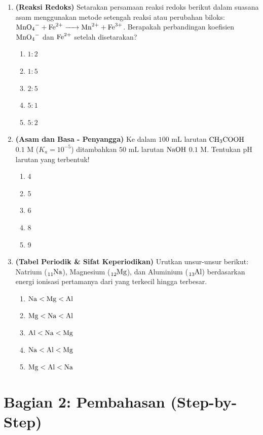 \documentclass[12pt,a4paper]{article}
\begin{document}
\begin{enumerate}
    \item \textbf{(Reaksi Redoks)} Setarakan persamaan reaksi redoks berikut dalam suasana asam menggunakan metode setengah reaksi atau perubahan biloks: $\ce{MnO4^- + Fe^{2+} -> Mn^{2+} + Fe^{3+}}$. Berapakah perbandingan koefisien $\ce{MnO4^-}$ dan $\ce{Fe^{2+}}$ setelah disetarakan?
    \begin{enumerate}[label=\alph*.]
        \item $1 : 2$
        \item $1 : 5$
        \item $2 : 5$
        \item $5 : 1$
        \item $5 : 2$
    \end{enumerate}

    \item \textbf{(Asam dan Basa - Penyangga)} Ke dalam $100 \text{ mL}$ larutan $\ce{CH3COOH}$ $0.1 \text{ M}$ ($K_a = 10^{-5}$) ditambahkan $50 \text{ mL}$ larutan $\ce{NaOH}$ $0.1 \text{ M}$. Tentukan pH larutan yang terbentuk!
    \begin{enumerate}[label=\alph*.]
        \item 4
        \item 5
        \item 6
        \item 8
        \item 9
    \end{enumerate}

    \item \textbf{(Tabel Periodik \& Sifat Keperiodikan)} Urutkan unsur-unsur berikut: Natrium ($\ce{_{11}Na}$), Magnesium ($\ce{_{12}Mg}$), dan Aluminium ($\ce{_{13}Al}$) berdasarkan energi ionisasi pertamanya dari yang terkecil hingga terbesar.
    \begin{enumerate}[label=\alph*.]
        \item $\ce{Na} < \ce{Mg} < \ce{Al}$
        \item $\ce{Mg} < \ce{Na} < \ce{Al}$
        \item $\ce{Al} < \ce{Na} < \ce{Mg}$
        \item $\ce{Na} < \ce{Al} < \ce{Mg}$
        \item $\ce{Mg} < \ce{Al} < \ce{Na}$
    \end{enumerate}
\end{enumerate}

\newpage
\section*{Bagian 2: Pembahasan (Step-by-Step)}
\end{document}
